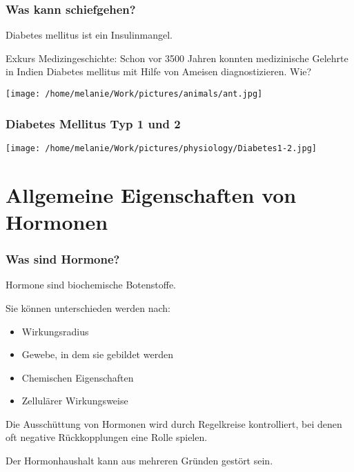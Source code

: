 \documentclass{beamer}
\begin{document}
\begin{frame}
\frametitle{Was kann schiefgehen?}

Diabetes mellitus ist ein Insulinmangel. 

\pause

Exkurs Medizingeschichte: Schon vor 3500 Jahren konnten medizinische Gelehrte in Indien Diabetes mellitus mit Hilfe von Ameisen diagnostizieren. \pause \textcolor{theme}{Wie?}

\begin{center}
\texttt{[image: /home/melanie/Work/pictures/animals/ant.jpg]}
\end{center}





\end{frame}


\begin{frame}
\frametitle{Diabetes Mellitus Typ 1 und 2}

\begin{center}
\texttt{[image: /home/melanie/Work/pictures/physiology/Diabetes1-2.jpg]}
\end{center}


\end{frame}



\section{Allgemeine Eigenschaften von Hormonen}

\begin{frame}
\frametitle{Was sind Hormone?}

Hormone sind biochemische Botenstoffe. 

\pause

Sie können unterschieden werden nach:

\begin{itemize}
\item
Wirkungsradius
\item
Gewebe, in dem sie gebildet werden
\item
Chemischen Eigenschaften
\item
Zellulärer Wirkungsweise
\end{itemize}

\pause

Die Ausschüttung von Hormonen wird durch Regelkreise kontrolliert, bei denen oft negative Rückkopplungen eine Rolle spielen. \\

\pause

Der Hormonhaushalt kann aus mehreren Gründen gestört sein.

\end{frame}
\end{document}
